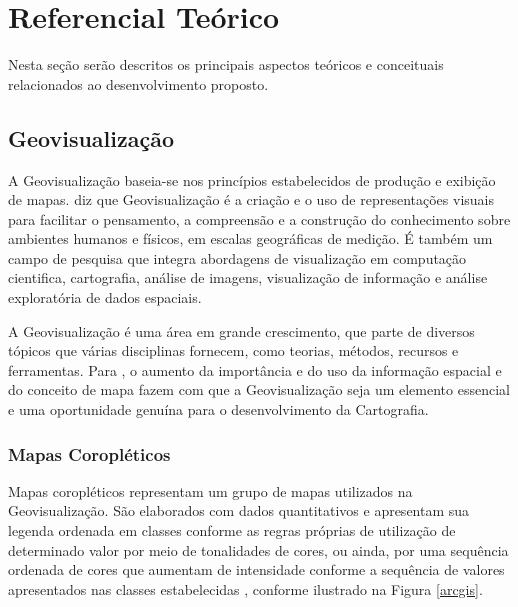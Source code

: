 \documentclass[12pt]{article}
\begin{document}
\section{Referencial Teórico} \label{referencial}

Nesta seção serão descritos os principais aspectos teóricos e conceituais relacionados ao desenvolvimento proposto.

\subsection{Geovisualização}

A Geovisualização baseia-se nos princípios estabelecidos de produção e exibição de mapas. \citet{scig} diz que Geovisualização é a criação e o uso de representações visuais para facilitar o pensamento, a compreensão e a construção do conhecimento sobre ambientes humanos e físicos, em escalas geográficas de medição. É também um campo de pesquisa que integra abordagens de visualização em computação cientifica, cartografia, análise de imagens, visualização de informação e análise exploratória de dados espaciais.

A Geovisualização é uma área em grande crescimento, que parte de diversos tópicos que várias disciplinas fornecem, como teorias, métodos, recursos e ferramentas. Para \citet{geopro}, o aumento da importância e do uso da informação espacial e do conceito de mapa fazem com que a Geovisualização seja um elemento essencial e uma oportunidade genuína para o desenvolvimento da Cartografia.

\subsubsection{Mapas Coropléticos} \label{coropleticos}

Mapas coropléticos representam um grupo de mapas utilizados na Geovisualização. São elaborados com dados quantitativos e apresentam sua legenda ordenada em classes conforme as regras próprias de utilização de determinado valor por meio de tonalidades de cores, ou ainda, por uma sequência ordenada de cores que aumentam de intensidade conforme a sequência de valores apresentados nas classes estabelecidas \citep{maptematico}, conforme ilustrado na Figura \ref{arcgis}.
\end{document}
